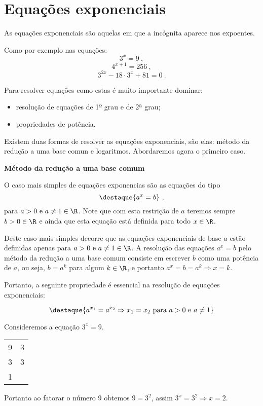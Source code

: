 \section{Equações exponenciais}

  \vskip0.3cm
 \colorbox{azul}{
 \begin{minipage}{0.9\linewidth}
 \begin{center}
  As equações exponenciais são aquelas em que a incógnita aparece nos expoentes.
 \end{center}
 \end{minipage}}
 \vskip0.3cm

 Como por exemplo nas equações:
 \[3^x= 9 \ ,\]
 \[4^{x+1}= 256 \ ,\]
 \[3^{2x}- 18\cdot 3^x + 81=0 \ .\]

 Para resolver equações como estas é muito importante dominar:
 \begin{itemize}
  \item resolução de equações de 1º grau e de 2ª grau;
  \item propriedades de potência.
 \end{itemize}

 Existem duas formas de resolver as equações exponenciais, são elas: método da redução a uma base comun e logaritmos. Abordaremos agora o primeiro caso.

 \vskip0.3cm

 \textbf{Método da redução a uma base comum}

 \vskip0.3cm

 O caso mais simples de equações exponencias são as equações do tipo
 \[\destaque{a^{x}= b} \ ,\]
 para $a > 0 \text{ e } a \neq 1 \in \R$. Note que com esta restrição de $a$ teremos sempre $b > 0 \in \R$ e ainda que esta equação está definida para todo $x \in \R$.

 Deste caso mais simples decorre que as equações exponenciais de base $a$ estão definidas apenas para $a > 0 \text{ e } a \neq 1 \in \R$. A resolução das equações $a^x= b$ pelo método da redução a uma base comum consiste em escrever $b$ como uma potência de $a$, ou seja, $b= a^k$  para algum $k \in \R$, e portanto $a^{x}= b= a^{k} \Rightarrow x= k$.

 Portanto, a seguinte propriedade é essencial na resolução de equações exponenciais:

 \[\destaque{ a^{x_1}= a^{x_2} \Rightarrow x_1= x_2 \text{ para } a>0 \text{ e } a \neq 1}\]

 \begin{exem}
  Consideremos a equação $3^x= 9$.

  \begin{tabular}{c|c}
  9 & 3 \\
  3 & 3 \\
  1 &
  \end{tabular}

  Portanto ao fatorar o número 9 obtemos $9= 3^2$, assim $3^x= 3^2 \Rightarrow x= 2$.
 \end{exem}


